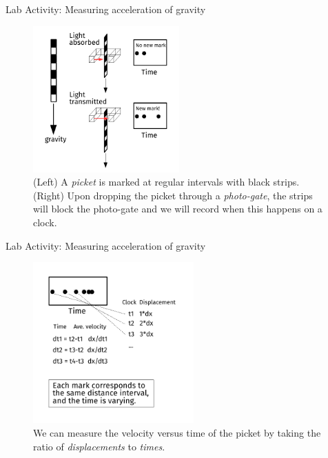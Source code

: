 \documentclass{beamer}
\begin{document}
\begin{frame}{Lab Activity: Measuring acceleration of gravity}
\small
\begin{figure}
\centering
\includegraphics[width=0.5\textwidth]{figures/PicketG.pdf}
\caption{\label{fig:picket} (Left) A \textit{picket} is marked at regular intervals with black strips.  (Right) Upon dropping the picket through a \textit{photo-gate}, the strips will block the photo-gate and we will record when this happens on a clock.}
\end{figure}
\end{frame}

\begin{frame}{Lab Activity: Measuring acceleration of gravity}
\small
\begin{figure}
\centering
\includegraphics[width=0.55\textwidth]{figures/PicketG2.pdf}
\caption{\label{fig:picket2} We can measure the velocity versus time of the picket by taking the ratio of \textit{displacements} to \textit{times}.}
\end{figure}
\end{frame}
\end{document}
